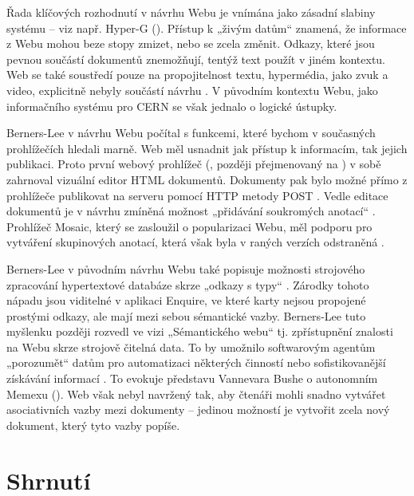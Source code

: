 \label{p:web:live}
Řada klíčových rozhodnutí v návrhu Webu je vnímána jako zásadní slabiny systému -- viz např. Hyper-G ().
Přístup k „živým datům“ znamená, že informace z Webu mohou beze stopy zmizet, nebo se zcela změnit. Odkazy, které jsou pevnou součástí dokumentů znemožňují, tentýž text použít v jiném kontextu. Web se také soustředí pouze na propojitelnost textu, hypermédia, jako zvuk a video, explicitně nebyly součástí návrhu \autocites{Berners-Lee1990}{Berners-Lee1989}. V původním kontextu Webu, jako informačního systému pro CERN se však jednalo o logické ústupky.

\label{p:web:edit}
Berners-Lee v návrhu Webu počítal s funkcemi, které bychom v současných prohlížečích hledali marně. Web měl usnadnit jak přístup k informacím, tak jejich publikaci. Proto první webový prohlížeč (, později přejmenovaný na ) v sobě zahrnoval vizuální editor HTML dokumentů. Dokumenty pak bylo možné přímo z prohlížeče publikovat na serveru pomocí HTTP metody POST \autocite[34]{Muller-Prove2002}. Vedle editace dokumentů je v návrhu zmíněná možnost „přidávání soukromých anotací“ \autocite[\pno~]{Berners-Lee1989}. Prohlížeč Mosaic, který se zasloužil o popularizaci Webu, měl podporu pro vytváření skupinových anotací, která však byla v raných verzích odstraněná \autocite{Summers2013}. 

\label{p:web:semantic}
Berners-Lee v původním návrhu Webu také popisuje možnosti strojového zpracování hypertextové databáze skrze „odkazy s typy“ \autocites[\pno~]{Berners-Lee1989}[21]{Berners-Lee1999}. Zárodky tohoto nápadu jsou viditelné v aplikaci Enquire, ve které karty nejsou propojené prostými odkazy, ale mají mezi sebou sémantické vazby. Berners-Lee tuto myšlenku později rozvedl ve vizi „Sémantického webu“ tj. zpřístupnění znalosti na Webu skrze strojově čitelná data. To by umožnilo softwarovým agentům „porozumět“ datům pro automatizaci některých činností nebo sofistikovanější získávání informací \autocite[177--198]{Berners-Lee1999}. To evokuje představu Vannevara Bushe o autonomním Memexu (). Web však nebyl navržený tak, aby čtenáři mohli snadno vytvářet asociativních vazby mezi dokumenty -- jedinou možností je vytvořit zcela nový dokument, který tyto vazby popíše.



\section{Shrnutí}

